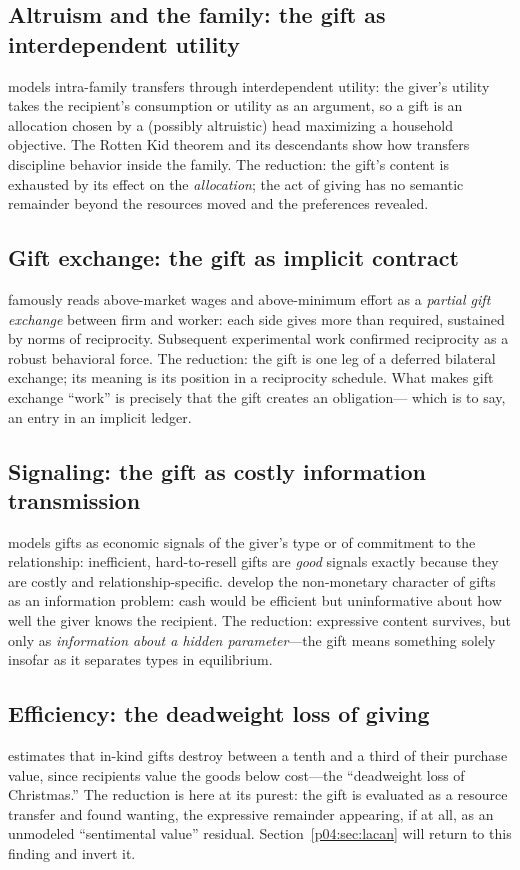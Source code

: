 \subsection{Altruism and the family: the gift as interdependent utility}
\textcite{becker1981} models intra-family transfers through interdependent
utility: the giver's utility takes the recipient's consumption or utility as
an argument, so a gift is an allocation chosen by a (possibly altruistic)
head maximizing a household objective. The Rotten Kid theorem and its
descendants show how transfers discipline behavior inside the family. The
reduction: the gift's content is exhausted by its effect on the
\emph{allocation}; the act of giving has no semantic remainder beyond the
resources moved and the preferences revealed.

\subsection{Gift exchange: the gift as implicit contract}
\textcite{akerlof1982} famously reads above-market wages and above-minimum
effort as a \emph{partial gift exchange} between firm and worker: each side
gives more than required, sustained by norms of reciprocity. Subsequent
experimental work \parencite{fehr1993} confirmed reciprocity as a robust
behavioral force. The reduction: the gift is one leg of a deferred bilateral
exchange; its meaning is its position in a reciprocity schedule. What makes
gift exchange ``work'' is precisely that the gift creates an obligation---
which is to say, an entry in an implicit ledger.

\subsection{Signaling: the gift as costly information transmission}
\textcite{camerer1988} models gifts as economic signals of the giver's type or
of commitment to the relationship: inefficient, hard-to-resell gifts are
\emph{good} signals exactly because they are costly and relationship-specific.
\textcite{prendergast2001} develop the non-monetary character of gifts as an
information problem: cash would be efficient but uninformative about how well
the giver knows the recipient. The reduction: expressive content survives,
but only as \emph{information about a hidden parameter}---the gift means
something solely insofar as it separates types in equilibrium.

\subsection{Efficiency: the deadweight loss of giving}
\textcite{waldfogel1993} estimates that in-kind gifts destroy between a tenth
and a third of their purchase value, since recipients value the goods below
cost---the ``deadweight loss of Christmas.'' The reduction is here at its
purest: the gift is evaluated as a resource transfer and found wanting, the
expressive remainder appearing, if at all, as an unmodeled ``sentimental
value'' residual. Section~\ref{p04:sec:lacan} will return to this finding and
invert it.

